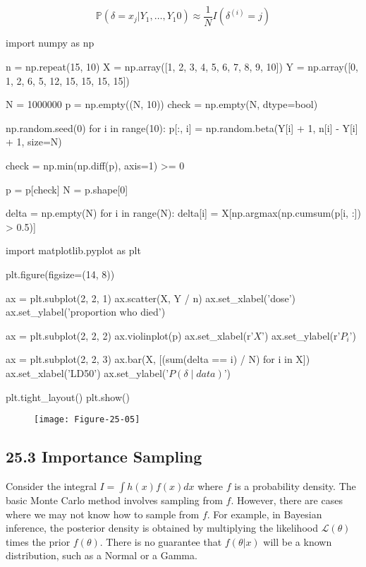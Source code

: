 \[ \mathbb{P}(\delta = x_{j} | Y_{1}, \dots, Y_{1}0) \approx \frac{1}{N} I(\delta^{(i)} = j) \]

\begin{python}
import numpy as np

n = np.repeat(15, 10)
X = np.array([1, 2, 3, 4, 5, 6, 7, 8, 9, 10])
Y = np.array([0, 1, 2, 6, 5, 12, 15, 15, 15, 15])
\end{python}

\begin{python}
N = 1000000
p = np.empty((N, 10))
check = np.empty(N, dtype=bool)

np.random.seed(0)
for i in range(10):
    p[:, i] = np.random.beta(Y[i] + 1, n[i] - Y[i] + 1, size=N)
    
check = np.min(np.diff(p), axis=1) >= 0

p = p[check]
N = p.shape[0]

delta = np.empty(N)
for i in range(N):
    delta[i] = X[np.argmax(np.cumsum(p[i, :]) > 0.5)]
\end{python}

\begin{python}
import matplotlib.pyplot as plt

plt.figure(figsize=(14, 8))

ax = plt.subplot(2, 2, 1)
ax.scatter(X, Y / n)
ax.set_xlabel('dose')
ax.set_ylabel('proportion who died')

ax = plt.subplot(2, 2, 2)
ax.violinplot(p)
ax.set_xlabel(r'$X$')
ax.set_ylabel(r'$P_{i}$')

ax = plt.subplot(2, 2, 3)
ax.bar(X, [(sum(delta == i) / N) for i in X])
ax.set_xlabel('LD50')
ax.set_ylabel('$P(\delta \;|\; data)$')

plt.tight_layout()
plt.show()
\end{python}

\begin{figure}[H]
\centering
\texttt{[image: Figure-25-05]}
\end{figure}

\subsection*{25.3 Importance Sampling}\label{importance-sampling}

Consider the integral \(I = \int h(x) f(x) dx\) where \(f\) is a
probability density. The basic Monte Carlo method involves sampling from
\(f\). However, there are cases where we may not know how to sample from
\(f\). For example, in Bayesian inference, the posterior density is
obtained by multiplying the likelihood \(\mathcal{L}(\theta)\) times the
prior \(f(\theta)\). There is no guarantee that \(f(\theta | x)\) will
be a known distribution, such as a Normal or a Gamma.

